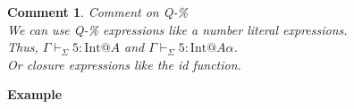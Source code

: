 \documentclass[9pt, a4paper]{extarticle}
\theoremstyle{break}
\newtheorem{cm}{Comment}
\newcommand{\figheader}[2]{
  \begin{flushleft}
    #2 {\bf \normalsize #1}
\end{flushleft}}
\newcommand{\G}{\Gamma}
\newcommand{\V}{\vdash_\Sigma}
\newcommand{\E}{\equiv}
\begin{document}
\begin{cm}{Comment on \textsc{Q-\%}\\}
	We can use \textsc{Q-\%} expressions like a number literal expressions.\\
	Thus, $\G\V 5 :\text{Int} @A$ and $\G\V 5 : \text{Int} @ A\alpha$.\\
	Or closure expressions like the id function.\\
\end{cm}


\figheader{Example}{}
\end{document}
